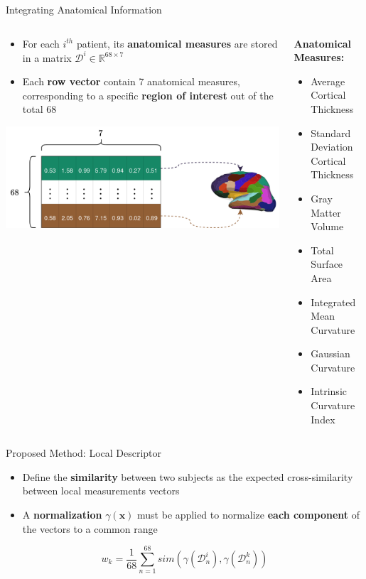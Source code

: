 \documentclass[12pt,aspectratio=169]{beamer}
\begin{document}
\begin{frame}{Integrating Anatomical Information}
\begin{columns}
    \begin{column}{.5\textwidth}
    \begin{itemize}
        \item For each $i^{th}$ patient, its \textbf{anatomical measures} are
        stored in a matrix $\mathcal{D}^i \in \mathbb{R}^{68 \times 7}$
        \item Each \textbf{row vector} contain 7 anatomical measures,
        corresponding to a specific \textbf{region of interest} out of the total
        68
    \end{itemize}
    \begin{center}
        \includegraphics[width=\textwidth]{source/desikan.png}
    \end{center}
    \end{column}
    \begin{column}{.5\textwidth}
        \textbf{Anatomical Measures:}
        \begin{itemize}
            \item Average Cortical Thickness
            \item Standard Deviation Cortical Thickness
            \item Gray Matter Volume
            \item Total Surface Area
            \item Integrated Mean Curvature
            \item Gaussian Curvature
            \item Intrinsic Curvature Index
        \end{itemize}
    \end{column}
\end{columns}
\end{frame}

\begin{frame}{Proposed Method: Local Descriptor}
\begin{itemize}
    \item Define the \textbf{similarity} between two subjects as the expected
    cross-similarity between local measurements vectors
    \item A \textbf{normalization} $\gamma(\mathbf{x})$ must be applied to
    normalize \textbf{each component} of the vectors to a common range
\end{itemize}
\begin{equation*}
   w_k = \frac{1}{68} \sum^{68}_{n=1} sim(\gamma(\mathcal{D}^i_n), \gamma(\mathcal{D}^k_n)) 
\end{equation*}
\end{frame}
\end{document}
